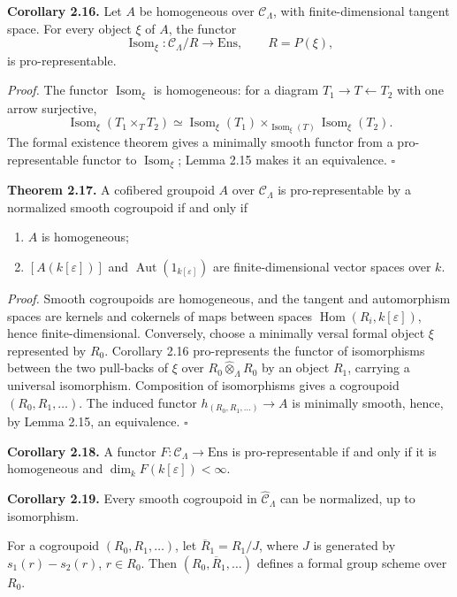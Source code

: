 \documentclass[11pt]{article}
\providecommand{\Aut}{\operatorname{Aut}}
\providecommand{\Isom}{\operatorname{Isom}}
\providecommand{\Hom}{\operatorname{Hom}}
\providecommand{\Isom}{\operatorname{Isom}}
\providecommand{\cC}{\mathcal C}
\begin{document}
\textbf{Corollary 2.16.}  Let \(A\) be homogeneous over \(\cC_\Lambda\), with finite-dimensional tangent space.  For every object \(\xi\) of \(A\), the functor
\[
 \Isom_\xi:\cC_\Lambda/R\longrightarrow \mathrm{Ens},\qquad R=P(\xi),
\]
is pro-representable.

\textit{Proof.}  The functor \(\Isom_\xi\) is homogeneous: for a diagram \(T_1\to T\leftarrow T_2\) with one arrow surjective,
\[
 \Isom_\xi(T_1\times_TT_2) \simeq \Isom_\xi(T_1)\times_{\Isom_\xi(T)}\Isom_\xi(T_2).
\]
The formal existence theorem gives a minimally smooth functor from a pro-representable functor to \(\Isom_\xi\); Lemma 2.15 makes it an equivalence. \(\square\)

\textbf{Theorem 2.17.}  A cofibered groupoid \(A\) over \(\cC_\Lambda\) is pro-representable by a normalized smooth cogroupoid if and only if
\begin{enumerate}[label=\textup{(\arabic*)}]
\item \(A\) is homogeneous;
\item \([A(k[\varepsilon])]\) and \(\Aut(1_{k[\varepsilon]})\) are finite-dimensional vector spaces over \(k\).
\end{enumerate}

\textit{Proof.}  Smooth cogroupoids are homogeneous, and the tangent and automorphism spaces are kernels and cokernels of maps between spaces \(\Hom(R_i,k[\varepsilon])\), hence finite-dimensional.  Conversely, choose a minimally versal formal object \(\xi\) represented by \(R_0\).  Corollary 2.16 pro-represents the functor of isomorphisms between the two pull-backs of \(\xi\) over \(R_0\widehat\otimes_\Lambda R_0\) by an object \(R_1\), carrying a universal isomorphism.  Composition of isomorphisms gives a cogroupoid \((R_0,R_1,\ldots)\).  The induced functor \(h_{(R_0,R_1,\ldots)}\to A\) is minimally smooth, hence, by Lemma 2.15, an equivalence. \(\square\)

\textbf{Corollary 2.18.}  A functor \(F:\cC_\Lambda\to\mathrm{Ens}\) is pro-representable if and only if it is homogeneous and \(\dim_k F(k[\varepsilon])<\infty\).

\textbf{Corollary 2.19.}  Every smooth cogroupoid in \(\widehat{\cC}_\Lambda\) can be normalized, up to isomorphism.

For a cogroupoid \((R_0,R_1,\ldots)\), let \(\overline R_1=R_1/J\), where \(J\) is generated by \(s_1(r)-s_2(r)\), \(r\in R_0\).  Then \((R_0,\overline R_1,\ldots)\) defines a formal group scheme over \(R_0\).
\end{document}
